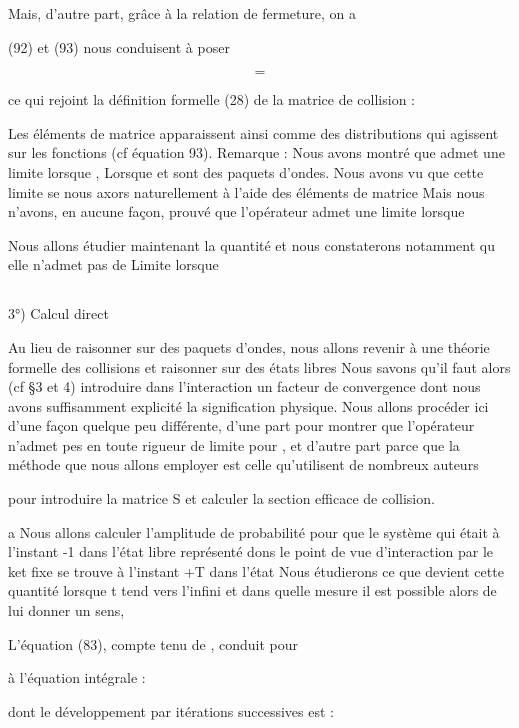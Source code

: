 Mais, d'autre part, grâce à la relation de fermeture, on a


(92) et (93) nous conduisent à poser

\[
\tag{94}=
\]

ce qui rejoint la définition formelle (28) de la matrice de collision :

Les éléments de matrice  apparaissent ainsi comme des distributions
qui agissent sur les fonctions (cf équation 93).
Remarque : 
Nous avons montré que  admet une limite lorsque
, Lorsque  et  sont des paquets d'ondes.
Nous avons vu que cette limite se nous axors naturellement à l'aide
des éléments de matrice
Mais nous n'avons, en aucune façon, prouvé que l'opérateur 
admet une limite lorsque 

Nous allons étudier maintenant la quantité
et nous constaterons notamment qu elle n'admet pas de Limite lorsque

\subsection{}%
3°) Calcul direct 

Au lieu de raisonner sur des paquets d'ondes, nous allons revenir
à une théorie formelle des collisions et raisonner sur des états libres
Nous savons qu'il faut alors (cf \S 3 et 4) introduire dans l'interaction un
facteur de convergence dont nous avons suffisamment explicité la signification
physique. Nous allons procéder ici d'une façon quelque peu différente,
d'une part pour montrer que l'opérateur  n'admet pes en toute rigueur de limite
pour , et d'autre part parce que la
méthode que nous allons employer est celle qu'utilisent de nombreux auteurs

pour introduire la matrice S et calculer la section efficace de collision.


a Nous allons calculer l'amplitude de probabilité
 pour que le système qui était à l'instant -1 dans l'état libre représenté dons
 le point de vue d'interaction par le ket fixe  se trouve à l'instant +T dans
l'état Nous étudierons ce que devient cette quantité lorsque t tend vers
l'infini et dans quelle mesure il est possible alors
de lui donner un sens,

L'équation (83), compte tenu de , conduit pour

%
 à l'équation intégrale :

dont le développement par itérations successives est :

